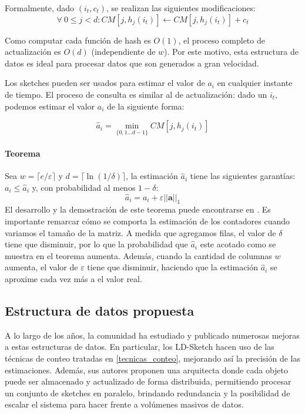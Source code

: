\documentclass[a4paper,10pt, oneside]{article}
\begin{document}
Formalmente, dado $(i_t, c_t)$, se realizan las siguientes modificaciones:
\begin{equation}
	\forall \ 0 \leq j < d: CM[j, h_j(i_t)] \leftarrow  CM[j, h_j(i_t)] + c_t
\end{equation}

Como computar cada función de hash es $O(1)$, el proceso completo de actualización es $O(d)$ (independiente de $w$). Por este motivo, esta estructura de datos es ideal para procesar datos que son generados a gran velocidad.

Los sketches pueden ser usados para estimar el valor de $a_i$ en cualquier instante de tiempo. El proceso de consulta es similar al de actualización: dado un $i_t$, podemos estimar el valor $a_i$ de la siguiente forma:

\begin{equation}
	\hat{a}_i = \min_{\{0,1  \dots d-1 \}}CM[j, h_j(i_t)]
\end{equation}

\paragraph{Teorema} Sea $w=\lceil e / \varepsilon \rceil$ y $d=\lceil \ln (1 / \delta) \rceil$, la estimación $\hat{a}_i$ tiene las siguientes garantías: $a_i \leq \hat{a}_i$ y, con probabilidad al menos $1-\delta$:
\begin{equation}
	\hat{a}_i = a_i + \varepsilon ||\mathbf{a}||_1
\end{equation}
El desarrollo y la demostración de este teorema puede encontrarse en \cite{Cormode:2005:IDS:1073713.1073718}. Es importante remarcar cómo se comporta la estimación de los contadores cuando variamos el tamaño de la matriz. A medida que agregamos filas, el valor de $\delta$ tiene que disminuir, por lo que la probabilidad que $\hat{a}_i$ este acotado como se muestra en el teorema aumenta. Además, cuando la cantidad de columnas $w$ aumenta, el valor de $\varepsilon$ tiene que disminuir, haciendo que la estimación $\hat{a}_i$ se aproxime cada vez más a el valor real.

\subsection{Estructura de datos propuesta}
A lo largo de los años, la comunidad ha estudiado y publicado numerosas mejoras a estas estructuras de datos. En particular, los LD-Sketch \cite{Huang:2015:HLD:2839515.2839568} hacen uso de las técnicas de conteo tratadas en \ref{tecnicas_conteo}, mejorando así la precisión de las estimaciones. Además, sus autores proponen una arquitecta donde cada objeto puede ser almacenado y actualizado de forma distribuida, permitiendo procesar un conjunto de sketches en paralelo, brindando redundancia y la posibilidad de escalar el sistema para hacer frente a volúmenes masivos de datos.
\end{document}
